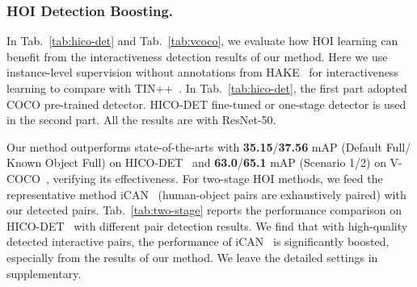 \documentclass[runningheads]{llncs}
\begin{document}
\subsubsection{HOI Detection Boosting.}
In Tab.~\ref{tab:hico-det} and Tab.~\ref{tab:vcoco}, we evaluate how HOI learning can benefit from the interactiveness detection results of our method. 
Here we use instance-level supervision without annotations from HAKE~\cite{hake,li2022hake} for interactiveness learning to compare with TIN++~\cite{li2021transferable}.
In Tab.~\ref{tab:hico-det}, the first part adopted COCO pre-trained detector. HICO-DET fine-tuned or one-stage detector is used in the second part. All the results are with ResNet-50.

Our method outperforms state-of-the-arts with \textbf{35.15}/\textbf{37.56} mAP (Default Full/ Known Object Full) on HICO-DET~\cite{hicodet} and \textbf{63.0}/\textbf{65.1} mAP (Scenario 1/2) on V-COCO~\cite{vcoco}, verifying its effectiveness.
For two-stage HOI methods, we feed the representative method iCAN~\cite{gao2018ican} (human-object pairs are exhaustively paired) with our detected pairs. 
Tab.~\ref{tab:two-stage} reports the performance comparison on HICO-DET~\cite{hicodet} with different pair detection results.
We find that with high-quality detected interactive pairs, the performance of iCAN~\cite{gao2018ican} is significantly boosted, especially from the results of our method. We leave the detailed settings in supplementary.


\begin{table}
\centering
{}
\caption{The performance comparison on HICO-DET~\cite{hicodet} with different pair detection results.}
\label{tab:two-stage}
\end{table}
\end{document}
